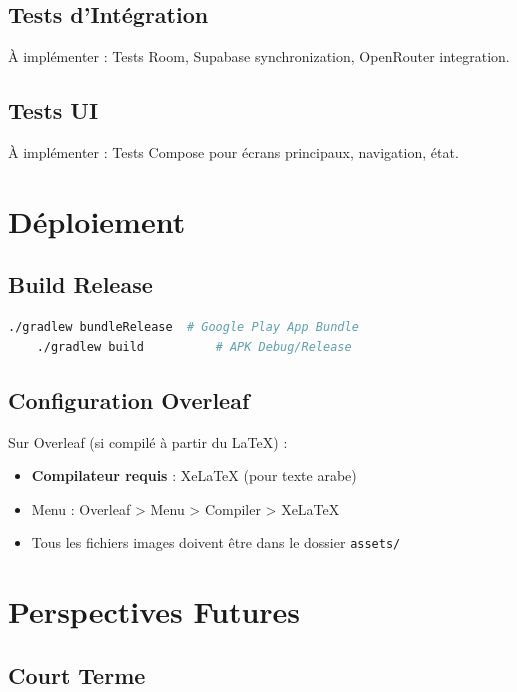 \documentclass[12pt,a4paper,openany]{report}
\begin{document}
    \section{Tests d'Intégration}

    À implémenter : Tests Room, Supabase synchronization, OpenRouter integration.

    \section{Tests UI}

    À implémenter : Tests Compose pour écrans principaux, navigation, état.

    \chapter{Déploiement}

    \section{Build Release}

    \begin{lstlisting}[language=bash]
    ./gradlew bundleRelease  # Google Play App Bundle
    ./gradlew build          # APK Debug/Release
    \end{lstlisting}

    \section{Configuration Overleaf}

    Sur Overleaf (si compilé à partir du LaTeX) :
    \begin{itemize}
      \item \textbf{Compilateur requis} : XeLaTeX (pour texte arabe)
      \item Menu : Overleaf > Menu > Compiler > XeLaTeX
      \item Tous les fichiers images doivent être dans le dossier \texttt{assets/}
    \end{itemize}

    \chapter{Perspectives Futures}

    \section{Court Terme}
\end{document}

